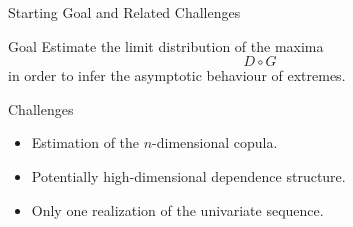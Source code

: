 \documentclass[10pt, aspectratio=169]{beamer}
\begin{document}
\begin{frame}{Starting Goal and Related Challenges}

  \begin{block}{Goal}
  \vspace{0.1cm}
    Estimate the limit distribution of the maxima
    \[
    D \circ G
    \]
    in order to infer the asymptotic behaviour of extremes.
  \end{block}

  \vspace{0.5cm}

  \begin{alertblock}{Challenges}
  \begin{itemize}
      \item Estimation of the $n$-dimensional copula.
      \item Potentially high-dimensional dependence structure.
      \item Only one realization of the univariate sequence.
  \end{itemize}
  \end{alertblock}

\end{frame}
\end{document}
